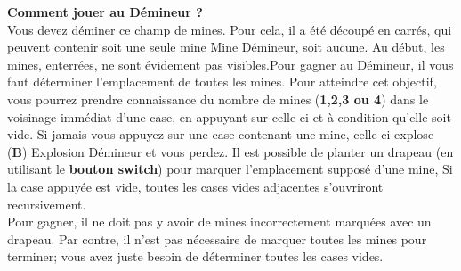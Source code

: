 \documentclass{article}
\begin{document}
\textbf {Comment jouer au Démineur ?}\\
Vous devez déminer ce champ de mines. Pour cela, il a été découpé en carrés, qui peuvent contenir soit une seule mine Mine Démineur, soit aucune. Au début, les mines, enterrées, ne sont évidement pas visibles.Pour gagner au Démineur, il vous faut déterminer l'emplacement de toutes les mines. Pour atteindre cet objectif, vous pourrez prendre connaissance du nombre de mines (\textbf{1,2,3 ou 4}) dans le voisinage immédiat d'une case, en appuyant sur celle-ci et à condition qu'elle soit vide. Si jamais vous appuyez sur une case contenant une mine, celle-ci explose (\textbf{B}) Explosion Démineur et vous perdez. Il est possible de planter un drapeau (en utilisant le \textbf{bouton switch}) pour marquer l'emplacement supposé d'une mine, Si la case appuyée est vide, toutes les cases vides adjacentes s'ouvriront recursivement.\\
Pour gagner, il ne doit pas y avoir de mines incorrectement marquées avec un drapeau. Par contre, il n'est pas nécessaire de marquer toutes les mines pour terminer; vous avez juste besoin de déterminer toutes les cases vides.\\
\end{document}
